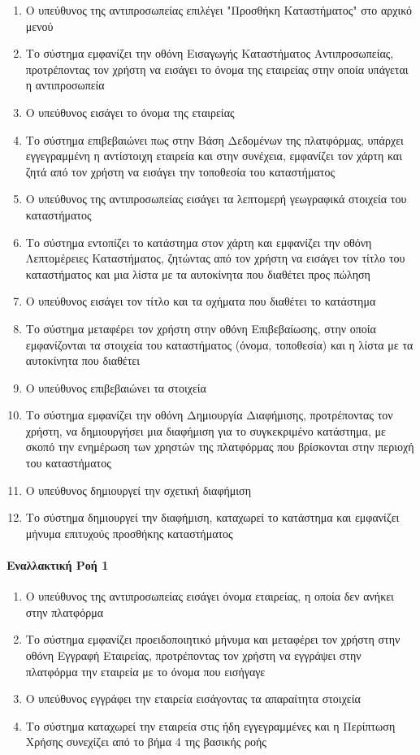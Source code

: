 \documentclass{../ol-softwaremanual}
\begin{document}
	\begin{enumerate}
		\item Ο υπεύθυνος της αντιπροσωπείας επιλέγει \en"\gr Προσθήκη Καταστήματος\en" \gr στο αρχικό μενού
		\item Το σύστημα εμφανίζει την οθόνη Εισαγωγής Καταστήματος Αντιπροσωπείας, προτρέποντας τον χρήστη να εισάγει το όνομα της εταιρείας στην οποία υπάγεται η αντιπροσωπεία
		\item Ο υπεύθυνος εισάγει το όνομα της εταιρείας
		\item Το σύστημα επιβεβαιώνει πως στην Βάση Δεδομένων της πλατφόρμας, υπάρχει εγγεγραμμένη η αντίστοιχη εταιρεία και στην συνέχεια, εμφανίζει τον χάρτη και ζητά από τον χρήστη να εισάγει την τοποθεσία του καταστήματος
		\item Ο υπεύθυνος της αντιπροσωπείας εισάγει τα λεπτομερή γεωγραφικά στοιχεία του καταστήματος
		\item Το σύστημα εντοπίζει το κατάστημα στον χάρτη και εμφανίζει την οθόνη Λεπτομέρειες Καταστήματος, ζητώντας από τον χρήστη να εισάγει τον τίτλο του καταστήματος και μια λίστα με τα αυτοκίνητα που διαθέτει προς πώληση
		\item Ο υπεύθυνος εισάγει τον τίτλο και τα οχήματα που διαθέτει το κατάστημα
		\item Το σύστημα μεταφέρει τον χρήστη στην οθόνη Επιβεβαίωσης, στην οποία εμφανίζονται τα στοιχεία του καταστήματος (όνομα, τοποθεσία) και η λίστα με τα αυτοκίνητα που διαθέτει
		\item Ο υπεύθυνος επιβεβαιώνει τα στοιχεία
		\item Το σύστημα εμφανίζει την οθόνη Δημιουργία Διαφήμισης, προτρέποντας τον χρήστη, να δημιουργήσει μια διαφήμιση για το συγκεκριμένο κατάστημα, με σκοπό την ενημέρωση των χρηστών της πλατφόρμας που βρίσκονται στην περιοχή του καταστήματος
		\item Ο υπεύθυνος δημιουργεί την σχετική διαφήμιση
		\item Το σύστημα δημιουργεί την διαφήμιση, καταχωρεί το κατάστημα και εμφανίζει μήνυμα επιτυχούς προσθήκης καταστήματος
	\end{enumerate}
	
	\paragraph{Εναλλακτική Ροή 1}
	
	\begin{enumerate}
		\item Ο υπεύθυνος της αντιπροσωπείας εισάγει όνομα εταιρείας, η οποία δεν ανήκει στην πλατφόρμα
		\item Το σύστημα εμφανίζει προειδοποιητικό μήνυμα και μεταφέρει τον χρήστη στην οθόνη Εγγραφή Εταιρείας, προτρέποντας τον χρήστη να εγγράψει στην πλατφόρμα την εταιρεία με το όνομα που εισήγαγε		
		\item Ο υπεύθυνος εγγράφει την εταιρεία εισάγοντας τα απαραίτητα στοιχεία
		\item Το σύστημα καταχωρεί την εταιρεία στις ήδη εγγεγραμμένες και η Περίπτωση Χρήσης συνεχίζει από το βήμα 4 της βασικής ροής
	\end{enumerate}
	
\end{document}
